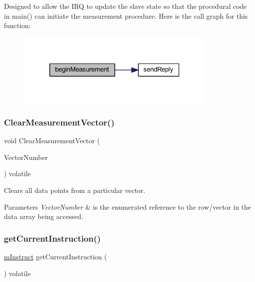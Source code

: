 Designed to allow the I\+RQ to update the slave state so that the procedural code in main() can initiate the measurement procedure. Here is the call graph for this function\+:
\nopagebreak
\begin{figure}[H]
\begin{center}
\leavevmode
\includegraphics[width=277pt]{class_master_a89cc4d6f65ee9922711cde4ed4bdf31c_cgraph}
\end{center}
\end{figure}
\mbox{\label{class_master_a94625b59aceffeceeae3b050885968ef}} 
\subsubsection{\texorpdfstring{ClearMeasurementVector()}{ClearMeasurementVector()}}
{\footnotesize\ttfamily void Clear\+Measurement\+Vector (\begin{DoxyParamCaption}\item[{\mbox{\hyperlink{_s_p_i___instruction_set_8h_a9d8048399836e11887f85cc8dc3d75d5}{Measurement\+Vectors}}}]{Vector\+Number }\end{DoxyParamCaption}) volatile}



Clears all data points from a particular vector. 


\begin{DoxyParams}{Parameters}
{\em Vector\+Number} & is the enumerated reference to the row/vector in the data array being accessed. \\
\hline
\end{DoxyParams}
\mbox{\label{class_master_af892816882821b107d888f3fe3d7dddd}} 
\subsubsection{\texorpdfstring{getCurrentInstruction()}{getCurrentInstruction()}}
{\footnotesize\ttfamily \mbox{\hyperlink{_s_p_i___instruction_set_8h_afefab269eb3692ecb3e5fcdbb9440792}{m\+Instruct}} get\+Current\+Instruction (\begin{DoxyParamCaption}\item[{void}]{ }\end{DoxyParamCaption}) volatile}



